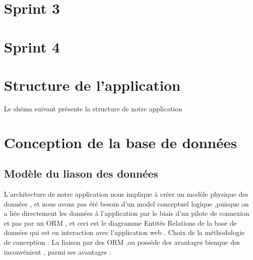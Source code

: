 \section{ Sprint 3 }


\section{ Sprint 4 }


\section{Structure de l'application}
Le sh\'{e}ma suivant pr\'{e}sente la structure de notre application



\section{Conception de la base de donn\'{e}es}

\subsection{Mod\`{e}le du liason des donn\'{e}es }
L'architecture de notre application nous implique \`{a} cr\'{e}er un mod\`{e}le physique
des donn\'{e}es , et nous avons pas \'{e}t\'{e} besoin d'un model conceptuel logique
,puisque on a li\'{e}e directement les donn\'{e}es \`{a} l'application par le biais d'un
pilote de connexion et pas par un ORM , et ceci est le diagramme
Entit\'{e}s \textendash{}Relations de la base de donn\'{e}es qui est en interaction avec
l'application web .
Choix de la m\'{e}thodologie de conception :
La liaison par des ORM ,ou poss\'{e}de des avantages bienque des inconv\'{e}nient ,
parmi ses avantages :

